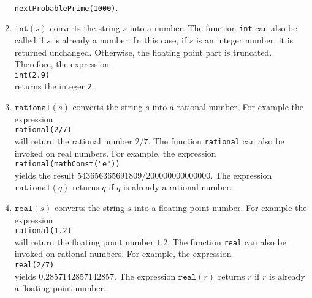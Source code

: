\begin{enumerate}
      \\[0.2cm]
      \hspace*{1.3cm}
      \texttt{nextProbablePrime(1000)}.
\item $\texttt{int}(s)$ converts the string $s$ into a number.
      The function \texttt{int} can also be called if $s$ is already a
      number.  In this case,  if $s$ is an integer number, it is returned unchanged.  Otherwise,
      the floating point part is truncated.  Therefore, the expression
      \\[0.2cm]
      \hspace*{1.3cm}
      \texttt{int(2.9)}
      \\[0.2cm]
      returns the integer \texttt{2}.
\item $\mathtt{rational}(s)$ converts the string $s$ into a rational number.  For example
      the expression
      \\[0.2cm]
      \hspace*{1.3cm}
      \texttt{rational(2/7)}
      \\[0.2cm]
      will return the rational number $2/7$.  The function \texttt{rational} can also be
      invoked on real numbers.  For example, the expression 
      \\[0.2cm]
      \hspace*{1.3cm}
      \texttt{rational(mathConst("e"))}
      \\[0.2cm]
      yields the result $543656365691809/200000000000000$.  
      The expression $\mathtt{rational}(q)$ returns $q$ if $q$ is already a rational number.
\item $\texttt{real}(s)$ converts the string $s$ into a floating point number.  For example
      the expression
      \\[0.2cm]
      \hspace*{1.3cm}
      \texttt{rational(1.2)}
      \\[0.2cm]
      will return the floating point number $1.2$.  The function \texttt{real} can also be
      invoked on rational numbers.  For example, the expression 
      \\[0.2cm]
      \hspace*{1.3cm}
      \texttt{real(2/7)}
      \\[0.2cm]
      yields  $0.2857142857142857$.
      The expression $\mathtt{real}(r)$ returns $r$ if $r$ is already a floating point
      number.


\end{enumerate}

